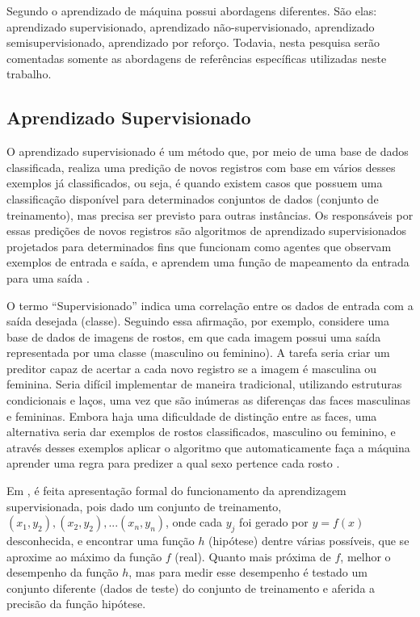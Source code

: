 Segundo \cite{Mohri2012} o aprendizado de máquina possui abordagens diferentes. São elas: aprendizado supervisionado, aprendizado não-supervisionado, aprendizado semisupervisionado, aprendizado por reforço. Todavia, nesta pesquisa serão comentadas somente as abordagens de referências específicas utilizadas neste trabalho. 

\subsection{Aprendizado Supervisionado}\label{cap:refTeor:ssec:aprendSup}

O aprendizado supervisionado é um método que, por meio de uma base de dados classificada, realiza uma predição de novos registros com base em vários desses exemplos já classificados, ou seja, é quando existem casos que possuem uma classificação disponível para determinados conjuntos de dados (conjunto de treinamento), mas precisa ser previsto para outras instâncias. Os responsáveis por essas predições de novos registros são algoritmos de aprendizado supervisionados projetados para determinados fins que funcionam como agentes que observam exemplos de entrada e saída, e aprendem uma função de mapeamento  da entrada para uma saída \cite{RusselStuart.Norvig2013}. 

O termo “Supervisionado” indica uma correlação entre os dados de entrada com a saída desejada (classe). Seguindo essa afirmação, por exemplo, considere uma base de dados de imagens de rostos, em que cada imagem possui uma saída representada por uma classe (masculino ou feminino). A tarefa seria criar um preditor capaz de acertar a cada novo registro se a imagem é masculina ou feminina. Seria difícil implementar de maneira tradicional, utilizando estruturas condicionais e laços, uma vez que são inúmeras as diferenças das faces masculinas e femininas. Embora haja uma dificuldade de distinção entre as faces, uma alternativa seria dar exemplos de rostos classificados, masculino ou feminino, e através desses exemplos aplicar o algoritmo que automaticamente faça a máquina aprender uma regra para predizer a qual sexo pertence cada rosto \cite{Barber2011}.

Em , é feita apresentação formal do funcionamento da aprendizagem supervisionada, pois dado um conjunto de treinamento, 
${(x_{1},y_{2}),(x_{2},y_{2}),...(x_{n},y_{n})}$, onde cada ${y_{j}} $ foi gerado por ${y=f(x)}$  desconhecida, e encontrar uma função ${h}$ (hipótese) dentre várias possíveis, que se aproxime ao máximo da função ${f}$ (real). Quanto mais próxima de ${f}$,  melhor o desempenho da função ${h}$, mas para medir esse desempenho é testado um conjunto diferente (dados de teste) do conjunto de treinamento e aferida a precisão da função hipótese. 

